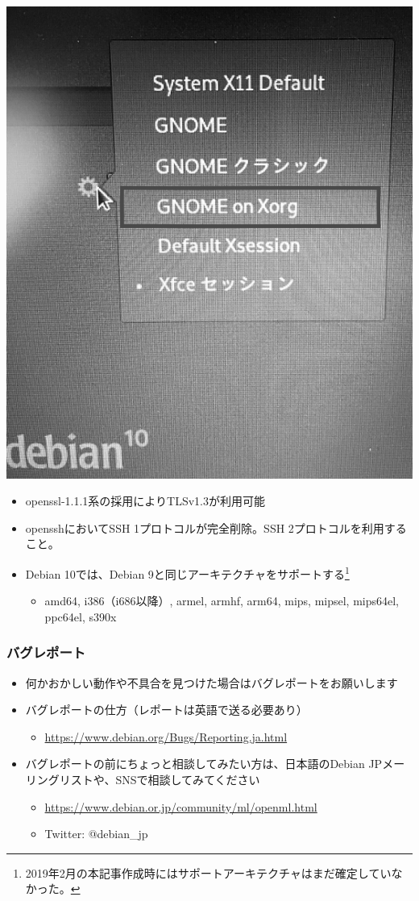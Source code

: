 \documentclass[mingoth,a4paper]{jsarticle}
\begin{document}
\begin{center}
  \includegraphics[width=0.5\hsize]{image201902/GDM_GNOME_select_mark_gray.png}
\end{center}





  \begin{itemize}
  \item openssl-1.1.1系の採用によりTLSv1.3が利用可能
  \item opensshにおいてSSH 1プロトコルが完全削除。SSH 2プロトコルを利用すること。
  \item Debian 10では、Debian 9と同じアーキテクチャをサポートする\footnote{2019年2月の本記事作成時にはサポートアーキテクチャはまだ確定していなかった。}
    \begin{itemize}
    \item amd64, i386（i686以降）, armel, armhf, arm64, mips, mipsel, mips64el, ppc64el, s390x
    \end{itemize}
  \end{itemize}




\subsubsection{バグレポート}

  \begin{itemize}
  \item 何かおかしい動作や不具合を見つけた場合はバグレポートをお願いします
  \item バグレポートの仕方（レポートは英語で送る必要あり）
    \begin{itemize}
    \item \url{https://www.debian.org/Bugs/Reporting.ja.html}
    \end{itemize}
  \item バグレポートの前にちょっと相談してみたい方は、日本語のDebian JPメーリングリストや、SNSで相談してみてください
    \begin{itemize}
    \item \url{https://www.debian.or.jp/community/ml/openml.html}
    \item Twitter: @debian\_jp
    \end{itemize}
  \end{itemize}
\end{document}
